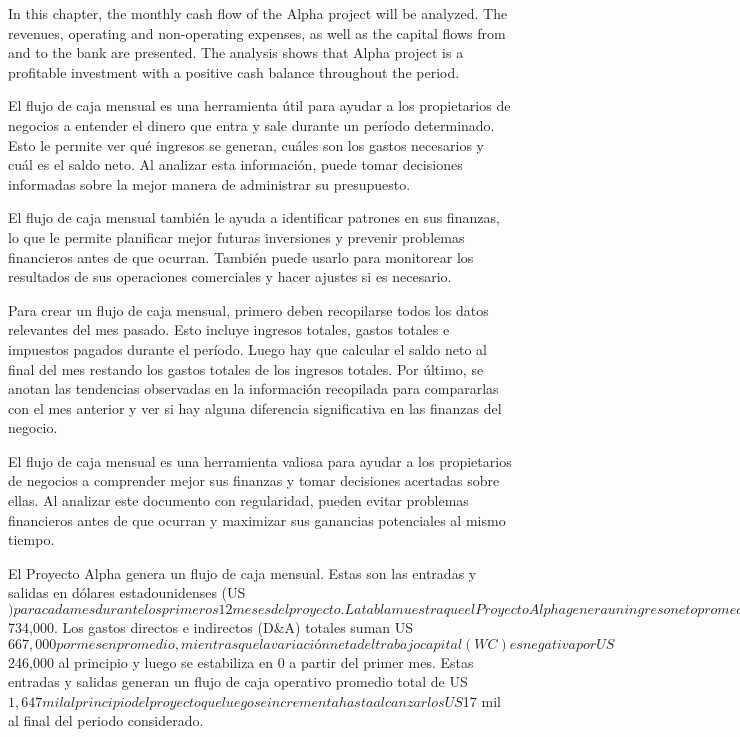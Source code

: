 
In this chapter, the monthly cash flow of the Alpha project will be analyzed. The revenues, operating and non-operating expenses, as well as the capital flows from and to the bank are presented. The analysis shows that Alpha project is a profitable investment with a positive cash balance throughout the period.

                El flujo de caja mensual es una herramienta útil para ayudar a los propietarios de negocios a entender el dinero que entra y sale durante un período determinado. Esto le permite ver qué ingresos se generan, cuáles son los gastos necesarios y cuál es el saldo neto. Al analizar esta información, puede tomar decisiones informadas sobre la mejor manera de administrar su presupuesto. 
            
                El flujo de caja mensual también le ayuda a identificar patrones en sus finanzas, lo que le permite planificar mejor futuras inversiones y prevenir problemas financieros antes de que ocurran. También puede usarlo para monitorear los resultados de sus operaciones comerciales y hacer ajustes si es necesario. 
            
                Para crear un flujo de caja mensual, primero deben recopilarse todos los datos relevantes del mes pasado. Esto incluye ingresos totales, gastos totales e impuestos pagados durante el período. Luego hay que calcular el saldo neto al final del mes restando los gastos totales de los ingresos totales. Por último, se anotan las tendencias observadas en la información recopilada para compararlas con el mes anterior y ver si hay alguna diferencia significativa en las finanzas del negocio. 
            
                El flujo de caja mensual es una herramienta valiosa para ayudar a los propietarios de negocios a comprender mejor sus finanzas y tomar decisiones acertadas sobre ellas. Al analizar este documento con regularidad, pueden evitar problemas financieros antes de que ocurran y maximizar sus ganancias potenciales al mismo tiempo.

                El Proyecto Alpha genera un flujo de caja mensual. Estas son las entradas y salidas en dólares estadounidenses (US$) para cada mes durante los primeros 12 meses del proyecto. La tabla muestra que el Proyecto Alpha genera un ingreso neto promedio mensual de US$734,000. Los gastos directos e indirectos (D&A) totales suman US$667,000 por mes en promedio, mientras que la variación neta del trabajo capital (WC) es negativa por US$246,000 al principio y luego se estabiliza en 0 a partir del primer mes. Estas entradas y salidas generan un flujo de caja operativo promedio total de US$1,647 mil al principio del proyecto que luego se incrementa hasta alcanzar los US$17 mil al final del periodo considerado.

